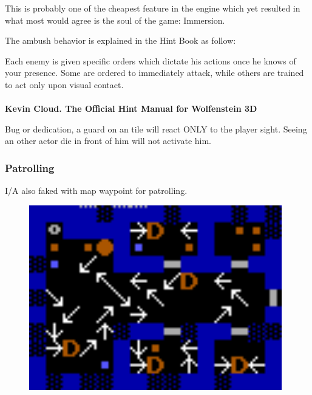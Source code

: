 This is probably one of the cheapest feature in the engine which yet resulted in what most would agree is the soul of the game: Immersion.\\
\par

 The ambush behavior is explained in the Hint Book as follow:\\
\par
\begin{fancyquotes}
Each enemy is given specific orders which dictate his actions once he knows of your presence. Some are ordered to immediately attack, while others are trained to act only upon visual contact.
 \bigskip \\
\bigskip \\
\textbf{Kevin Cloud. The Official Hint Manual for Wolfenstein 3D}
 \end{fancyquotes}

 Bug or dedication, a guard on an  tile will react ONLY to the player sight. Seeing an other actor die in front of him will not activate him.\\


\subsubsection{Patrolling}
I/A also faked with map waypoint for patrolling.\\
\par
\par
\begin{figure}[H]
 \centering
 \includegraphics[width=0.98\textwidth]{imgs/drawings/path.png}
\end{figure}
\par







